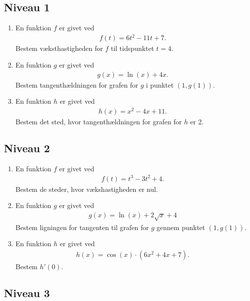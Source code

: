 \subsection*{Niveau 1}

\begin{enumerate}[label=\roman*)]
	\item En funktion $f$ er givet ved
	\begin{align*}
		f(t) = 6t^2-11t+7.
	\end{align*}
	Bestem væksthastigheden for $f$ til tidspunktet $t = 4$.
	\item En funktion $g$ er givet ved
	\begin{align*}
		g(x) = \ln(x)+4x.
	\end{align*}
	Bestem tangenthældningen for grafen for $g$ i punktet $(1,g(1))$.
	\item En funktion $h$ er givet ved
	\begin{align*}
		h(x) = x^2-4x+11.
	\end{align*}
	Bestem det sted, hvor tangenthældningen for grafen for $h$ er 2.
	
\end{enumerate}

\subsection*{Niveau 2}

\begin{enumerate}[label=\roman*)]
	\item En funktion $f$ er givet ved
	\begin{align*}
		f(t) = t^3 - 3t^2 + 4.
	\end{align*}
	Bestem de steder, hvor vækshastigheden er nul.
	\item En funktion $g$ er givet ved
	\begin{align*}
		g(x) = \ln(x)+2\sqrt{x}+4
	\end{align*}
	Bestem ligningen for tangenten til grafen for $g$ gennem punktet $(1,g(1))$. 
	\item En funktion $h$ er givet ved
	\begin{align*}
		h(x) = \cos(x)\cdot(6x^2+4x+7).
	\end{align*}
	Bestem $h'(0)$.

\end{enumerate}

\subsection*{Niveau 3}


